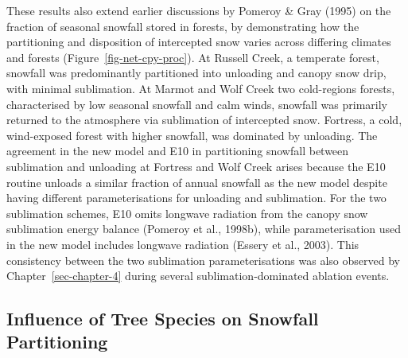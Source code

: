 \documentclass[
  letterpaper,
]{tex/uofsthesis-cs}
\begin{document}
These results also extend earlier discussions by Pomeroy \& Gray (1995)
on the fraction of seasonal snowfall stored in forests, by demonstrating
how the partitioning and disposition of intercepted snow varies across
differing climates and forests (Figure~\ref{fig-net-cpy-proc}). At
Russell Creek, a temperate forest, snowfall was predominantly
partitioned into unloading and canopy snow drip, with minimal
sublimation. At Marmot and Wolf Creek two cold-regions forests,
characterised by low seasonal snowfall and calm winds, snowfall was
primarily returned to the atmosphere via sublimation of intercepted
snow. Fortress, a cold, wind-exposed forest with higher snowfall, was
dominated by unloading. The agreement in the new model and E10 in
partitioning snowfall between sublimation and unloading at Fortress and
Wolf Creek arises because the E10 routine unloads a similar fraction of
annual snowfall as the new model despite having different
parameterisations for unloading and sublimation. For the two sublimation
schemes, E10 omits longwave radiation from the canopy snow sublimation
energy balance (Pomeroy et al., 1998b), while parameterisation used in
the new model includes longwave radiation (Essery et al., 2003). This
consistency between the two sublimation parameterisations was also
observed by Chapter~\ref{sec-chapter-4} during several
sublimation-dominated ablation events.

\subsection{Influence of Tree Species on Snowfall
Partitioning}\label{influence-of-tree-species-on-snowfall-partitioning}
\end{document}
